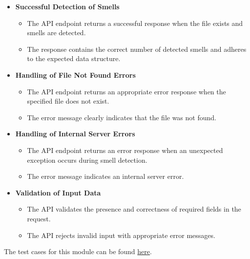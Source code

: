 \documentclass[12pt, titlepage]{article}
\begin{document}
\begin{itemize}
  \item \textbf{Successful Detection of Smells}
  \begin{itemize}
    \item The API endpoint returns a successful response when the file exists and smells are detected.
    \item The response contains the correct number of detected smells and adheres to the expected data structure.
  \end{itemize}

  \item \textbf{Handling of File Not Found Errors}
  \begin{itemize}
      \item The API endpoint returns an appropriate error response when the specified file does not exist.
      \item The error message clearly indicates that the file was not found.
  \end{itemize}

  \item \textbf{Handling of Internal Server Errors}
  \begin{itemize}
      \item The API endpoint returns an error response when an unexpected exception occurs during smell detection.
      \item The error message indicates an internal server error.
  \end{itemize}

  \item \textbf{Validation of Input Data}
  \begin{itemize}
      \item The API validates the presence and correctness of required fields in the request.
      \item The API rejects invalid input with appropriate error messages.
  \end{itemize}

\end{itemize}

\noindent The test cases for this module can be found \href{https://github.com/ssm-lab/capstone--source-code-optimizer/blob/new-poc/tests/api/test_detect_route.py}{here}.

\end{document}
